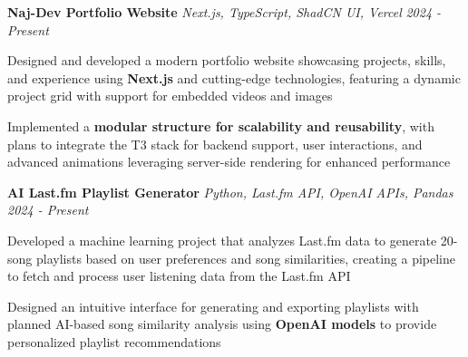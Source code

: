 \documentclass[letterpaper]{article}
\begin{document}
    \vspace{-2mm}
    {\textbf{Naj-Dev Portfolio Website}} {\sl Next.js, TypeScript, ShadCN UI, Vercel} \hfill \textsl{2024 - Present}\\
    \vspace{-2mm}
    \begin{tightitemize} \itemsep -1mm
    
        \item Designed and developed a modern portfolio website showcasing projects, skills, and experience using \textbf{Next.js} and cutting-edge technologies, featuring a dynamic project grid with support for embedded videos and images

        \item Implemented a \textbf{modular structure for scalability and reusability}, with plans to integrate the T3 stack for backend support, user interactions, and advanced animations leveraging server-side rendering for enhanced performance

    \end{tightitemize}
    \vspace{-2mm}

    {\textbf{AI Last.fm Playlist Generator}} {\sl Python, Last.fm API, OpenAI APIs, Pandas} \hfill \textsl{2024 - Present}\\
    \vspace{-2mm}
    \begin{tightitemize} \itemsep -1mm
    
        \item Developed a machine learning project that analyzes Last.fm data to generate 20-song playlists based on user preferences and song similarities, creating a pipeline to fetch and process user listening data from the Last.fm API

        \item Designed an intuitive interface for generating and exporting playlists with planned AI-based song similarity analysis using \textbf{OpenAI models} to provide personalized playlist recommendations

    \end{tightitemize}
    \vspace{-2mm}
\end{document}

